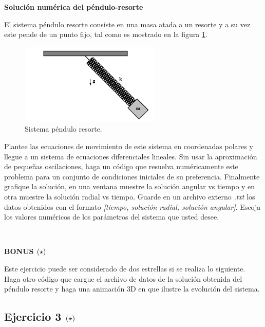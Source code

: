 \textbf{Solución numérica del péndulo-resorte}

El sistema péndulo resorte consiste en una masa atada a un resorte y a su 
vez este pende de un punto fijo, tal como es mostrado en la figura 
\ref{fig:pendulum_spring}.


\begin{figure}[htbp]
	\centering
	\includegraphics[width=0.60\textwidth]
	{./pictures/pendulum_spring.png}

	\caption{\small{Sistema péndulo resorte.}}
	
	\label{fig:pendulum_spring}
\end{figure}

Plantee las ecuaciones de movimiento de este sistema en coordenadas polares
y llegue a un sistema de ecuaciones diferenciales lineales. Sin usar la 
aproximación de pequeñas oscilaciones, haga un código que resuelva 
numéricamente este problema para un conjunto de condiciones iniciales de su 
preferencia. Finalmente grafique la solución, en una ventana muestre la 
solución angular vs tiempo y en otra muestre la solución radial vs tiempo. 
Guarde en un archivo externo \textit{.txt} los datos obtenidos con el 
formato \textit{[tiempo, solución radial, solución angular]}. Escoja los 
valores numéricos de los parámetros del sistema que usted desee.

\

\textbf{BONUS \large{$\left( \star \right)$}}

Este ejercicio puede ser considerado de dos estrellas si se realiza lo siguiente.
Haga otro código que cargue el archivo de datos de la solución obtenida del 
péndulo resorte y haga una animación 3D en \mayavi que ilustre la evolución del 
sistema.

\newpage
\subsection*{Ejercicio 3 \large{$\left( \star \right)$}}

